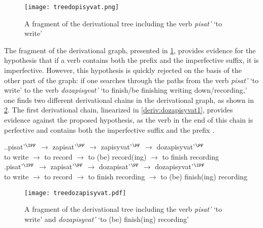 \begin{figure}
\begin{center}
\texttt{[image: treedopisyvat.png]}
\caption{A fragment of the derivational tree including the verb \textit{pisat'} `to write'\label{tree:dopisyvat}}
\end{center}
\end{figure}

The fragment of the derivational graph, presented in \ref{tree:dopisyvat}, provides evidence for the hypothesis that if a verb contains both the prefix  and the imperfective suffix, it is imperfective. However, this hypothesis is quickly rejected on the basis of the other part of the graph: if one searches through the paths from the verb {\it pisat'} `to write' to the verb {\it dozapisyvat'} `to finish/be finishing writing down/recording,' one finds two different derivational chains in the derivational graph, as shown in \ref{tree:dozapisyvat}. The first derivational chain, linearized in \ref{deriv:dozapisyvat1}, provides evidence against the proposed hypothesis, as the verb in the end of this chain is perfective and contains both the imperfective suffix and the prefix . 

\ex.\label{deriv:dozapisyvat}\ag.\label{deriv:dozapisyvat1}pisat'$^\IPF$ $\rightarrow$ zapisat'$^\PF$ $\rightarrow$ zapisyvat'$^\PF$ $\rightarrow$ dozapisyvat'$^\PF$\\
{to write} $\rightarrow$ {to record} $\rightarrow$ {to (be) record(ing)} $\rightarrow$ {to finish recording}\\
\bg.\label{deriv:dozapisyvat2}pisat'$^\IPF$ $\rightarrow$ zapisat'$^\PF$ $\rightarrow$ dozapisat'$^\PF$ $\rightarrow$ dozapisyvat'$^\IPF$\\
{to write} $\rightarrow$ {to record} $\rightarrow$ {to finish recording} $\rightarrow$ {to (be) finish(ing) recording}\\				

\begin{figure}
\begin{center}
\texttt{[image: treedozapisyvat.pdf]}
\caption{A fragment of the derivational tree including the verb \textit{pisat'} `to write' and \textit{dozapisyvat'} `to (be) finish(ing) recording'\label{tree:dozapisyvat}}
\end{center}
\end{figure}			

